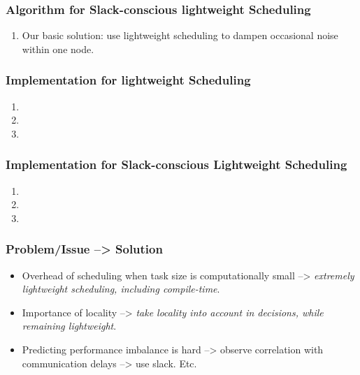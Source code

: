 \begin{frame} 
\frametitle{Algorithm for Slack-conscious lightweight Scheduling} 
\begin{enumerate} 
\item \small Our basic solution: use lightweight scheduling to dampen
  occasional noise within one node. 
\end{enumerate} 
\end{frame} 

\begin{frame}
\frametitle{Implementation for lightweight Scheduling} 
\begin{enumerate} 
\item \small 
\item \small 
\item \small 
\end{enumerate} 
\end{frame} 

\begin{frame}
\frametitle{Implementation for Slack-conscious Lightweight Scheduling} 
\begin{enumerate} 
\item \small 
\item \small 
\item \small 
\end{enumerate} 
\end{frame} 

\begin{frame}
\frametitle{Problem/Issue --> Solution}
\begin{itemize}
\item \small Overhead of scheduling when task size is computationally
  small --> \textit{extremely lightweight scheduling, including compile-time}. 
\item \small  Importance of locality --> \textit{take locality into account in
  decisions, while remaining lightweight}.
\item \small Predicting performance imbalance is hard --> observe
  correlation with communication delays --> use slack. Etc.  
\end{itemize} 
\end{frame}


